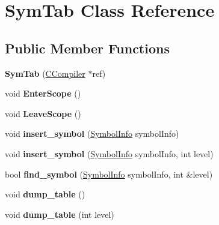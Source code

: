 \hypertarget{classSymTab}{\section{Sym\-Tab Class Reference}
\label{classSymTab}
}
\subsection*{Public Member Functions}
\begin{DoxyCompactItemize}
\item 
\hypertarget{classSymTab_a20c7b65c7ffb728fa792e87258d381a2}{{\bfseries Sym\-Tab} (\hyperlink{classCCompiler}{C\-Compiler} $\ast$ref)}\label{classSymTab_a20c7b65c7ffb728fa792e87258d381a2}

\item 
\hypertarget{classSymTab_af335dd1ba840dfab4219856545d5d8ef}{void {\bfseries Enter\-Scope} ()}\label{classSymTab_af335dd1ba840dfab4219856545d5d8ef}

\item 
\hypertarget{classSymTab_afd2c44208cdad3ddfc85136136cd27c3}{void {\bfseries Leave\-Scope} ()}\label{classSymTab_afd2c44208cdad3ddfc85136136cd27c3}

\item 
\hypertarget{classSymTab_ad8e59e29c50f039570c5844871bf838c}{void {\bfseries insert\-\_\-symbol} (\hyperlink{structSymbolInfo}{Symbol\-Info} symbol\-Info)}\label{classSymTab_ad8e59e29c50f039570c5844871bf838c}

\item 
\hypertarget{classSymTab_a8372047f573c6d84fa231aa7e9842280}{void {\bfseries insert\-\_\-symbol} (\hyperlink{structSymbolInfo}{Symbol\-Info} symbol\-Info, int level)}\label{classSymTab_a8372047f573c6d84fa231aa7e9842280}

\item 
\hypertarget{classSymTab_a2aedd91e00780c889e60a60fc0795daf}{bool {\bfseries find\-\_\-symbol} (\hyperlink{structSymbolInfo}{Symbol\-Info} symbol\-Info, int \&level)}\label{classSymTab_a2aedd91e00780c889e60a60fc0795daf}

\item 
\hypertarget{classSymTab_ab4c005eb114053be22fdbe315542f55b}{void {\bfseries dump\-\_\-table} ()}\label{classSymTab_ab4c005eb114053be22fdbe315542f55b}

\item 
\hypertarget{classSymTab_ad5d45136f341bf024a226fe600fb4dcc}{void {\bfseries dump\-\_\-table} (int level)}\label{classSymTab_ad5d45136f341bf024a226fe600fb4dcc}

\end{DoxyCompactItemize}
